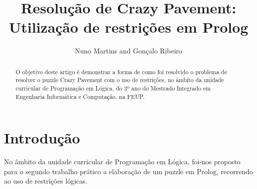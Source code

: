 \documentclass[runningheads,a4paper]{llncs}
\begin{document}
\mainmatter  %

\title{Resolução de Crazy Pavement:\\Utilização de restrições em Prolog}


%
%
\author{Nuno Martins and Gonçalo Ribeiro}

%
%

\maketitle


\begin{abstract}
O objetivo deste artigo é demonstrar a forma de como foi resolvido o problema de resolver o puzzle Crazy Pavement com o uso de restrições, no âmbito da unidade curricular de Programação em Lógica, do 3º ano do Mestrado Integrado em Engenharia Informática e Computação, na FEUP.
\end{abstract}

\newpage

\section{Introdução}

No âmbito da unidade curricular de Programação em Lógica, foi-nos proposto para o segundo trabalho prático a elaboração de um puzzle em Prolog, recorrendo ao uso de restrições lógicas.
\end{document}
